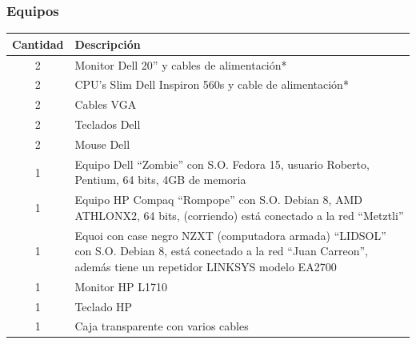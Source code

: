 \documentclass[a4paper,11pt]{article}                 %
\begin{document}
  \subsubsection{Equipos}
    \begin{table}[H]
    \centering
    \begin{tabular}{|c|l|}
    \hline
    Cantidad & Descripción                                                                                                                                                                \\ \hline
    2        & Monitor Dell 20” y cables de alimentación*                                                                                                                         \\ \hline
    2        & CPU’s Slim Dell Inspiron 560s y cable de alimentación*                                                                                                             \\ \hline
    2        & Cables VGA                                                                                                                                                         \\ \hline
    2        & Teclados Dell                                                                                                                                                      \\ \hline
    2        & Mouse Dell                                                                                                                                                         \\ \hline
    1        & Equipo Dell “Zombie” con S.O. Fedora 15, usuario Roberto, Pentium, 64 bits, 4GB de memoria                                                                         \\ \hline
    1        & Equipo HP Compaq “Rompope” con S.O. Debian 8, AMD ATHLONX2, 64 bits, (corriendo) está conectado a la red “Metztli”                                                 \\ \hline
    1        & Equoi con case negro NZXT (computadora armada) “LIDSOL” con S.O. Debian 8, está conectado a la red “Juan Carreon”, además tiene un repetidor LINKSYS modelo EA2700 \\ \hline
    1        & Monitor HP L1710                                                                                                                                                   \\ \hline
    1        & Teclado HP                                                                                                                                                         \\ \hline
    1        & Caja transparente con varios cables                                                                                                                                \\ \hline
    \end{tabular}
    \end{table}
\end{document}
